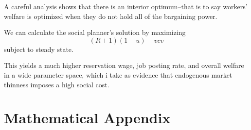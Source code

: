 \documentclass[WP]{AEA}
\begin{document}
A careful analysis shows that there is an interior optimum--that is to say workers' welfare is optimized when they do not hold all of the bargaining power.

We can calculate the social planner's solution by maximizing
\begin{equation} \label{DMP:welfare_planner}
(R+ 1)(1-u) -vcv
\end{equation}
subject to steady state. 

This yields a much higher reservation wage, job posting rate, and overall welfare in a wide parameter space, which i take as evidence that endogenous market thinness imposes a high social cost.

%
%
%
%
%
%




\appendix

\section{Mathematical Appendix}
\end{document}
